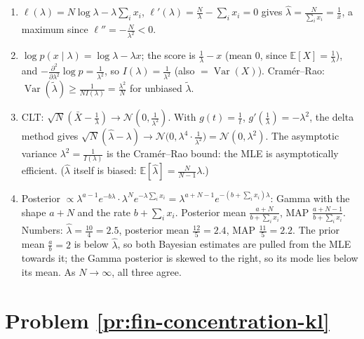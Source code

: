 \documentclass[11pt]{article}
\newcommand{\E}{\mathbb{E}}
\DeclareMathOperator{\Var}{Var}
\begin{document}
\begin{enumerate}[label=(\alph*)]
    \item $\ell(\lambda) = N\log\lambda - \lambda\sum_i x_i$, $\ell'(\lambda) = \frac{N}{\lambda} - \sum_i x_i = 0$ gives $\hat\lambda = \frac{N}{\sum_i x_i} = \frac{1}{\bar x}$, a maximum since $\ell'' = -\frac{N}{\lambda^2} < 0$.
    \item $\log p(x \mid \lambda) = \log\lambda - \lambda x$; the score is $\frac{1}{\lambda} - x$ (mean $0$, since $\E[X] = \frac{1}{\lambda}$), and $-\frac{\partial^2}{\partial\lambda^2}\log p = \frac{1}{\lambda^2}$, so $I(\lambda) = \frac{1}{\lambda^2}$ (also $= \Var(X)$). Cram\'er--Rao: $\Var(\tilde\lambda) \geq \frac{1}{NI(\lambda)} = \frac{\lambda^2}{N}$ for unbiased $\tilde\lambda$.
    \item CLT: $\sqrt{N}(\bar X - \frac{1}{\lambda}) \to \mathcal{N}(0, \frac{1}{\lambda^2})$. With $g(t) = \frac{1}{t}$, $g'(\frac{1}{\lambda}) = -\lambda^2$, the delta method gives $\sqrt{N}(\hat\lambda - \lambda) \to \mathcal{N}\big(0, \lambda^4 \cdot \frac{1}{\lambda^2}\big) = \mathcal{N}(0, \lambda^2)$. The asymptotic variance $\lambda^2 = \frac{1}{I(\lambda)}$ is the Cram\'er--Rao bound: the MLE is asymptotically efficient. ($\hat\lambda$ itself is biased: $\E[\hat\lambda] = \frac{N}{N - 1}\lambda$.)
    \item Posterior $\propto \lambda^{a-1}e^{-b\lambda} \cdot \lambda^Ne^{-\lambda\sum_i x_i} = \lambda^{a + N - 1}e^{-(b + \sum_i x_i)\lambda}$: Gamma with the shape $a + N$ and the rate $b + \sum_i x_i$. Posterior mean $\frac{a + N}{b + \sum_i x_i}$, MAP $\frac{a + N - 1}{b + \sum_i x_i}$. Numbers: $\hat\lambda = \frac{10}{4} = 2.5$, posterior mean $\frac{12}{5} = 2.4$, MAP $\frac{11}{5} = 2.2$. The prior mean $\frac{a}{b} = 2$ is below $\hat\lambda$, so both Bayesian estimates are pulled from the MLE towards it; the Gamma posterior is skewed to the right, so its mode lies below its mean. As $N \to \infty$, all three agree.
\end{enumerate}

\section*{Problem \ref{pr:fin-concentration-kl}}
\end{document}
